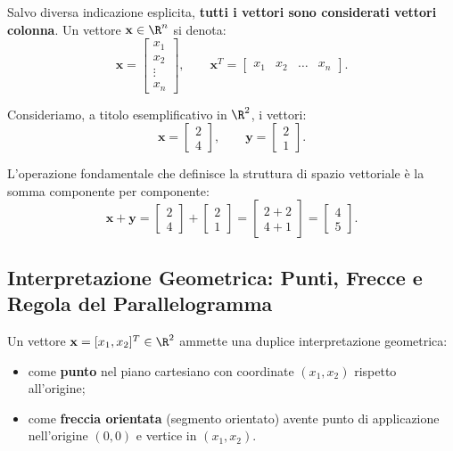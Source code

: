 Salvo diversa indicazione esplicita, \textbf{tutti i vettori sono considerati vettori colonna}. Un vettore $\mathbf{x} \in \R^n$ si denota:
\begin{equation}
    \mathbf{x} = \begin{bmatrix} x_1 \\ x_2 \\ \vdots \\ x_n \end{bmatrix}, \qquad \mathbf{x}^T = \begin{bmatrix} x_1 & x_2 & \dots & x_n \end{bmatrix}.
\end{equation}

Consideriamo, a titolo esemplificativo in $\R^2$, i vettori:
\begin{equation}
    \mathbf{x} = \begin{bmatrix} 2 \\ 4 \end{bmatrix}, \qquad \mathbf{y} = \begin{bmatrix} 2 \\ 1 \end{bmatrix}.
\end{equation}

L'operazione fondamentale che definisce la struttura di spazio vettoriale è la somma componente per componente:
\begin{equation}
    \mathbf{x} + \mathbf{y} = \begin{bmatrix} 2 \\ 4 \end{bmatrix} + \begin{bmatrix} 2 \\ 1 \end{bmatrix} = \begin{bmatrix} 2+2 \\ 4+1 \end{bmatrix} = \begin{bmatrix} 4 \\ 5 \end{bmatrix}.
\end{equation}

\subsection{Interpretazione Geometrica: Punti, Frecce e Regola del Parallelogramma}

Un vettore $\mathbf{x} = [x_1, x_2]^T \in \R^2$ ammette una duplice interpretazione geometrica:
\begin{itemize}
    \item come \textbf{punto} nel piano cartesiano con coordinate $(x_1, x_2)$ rispetto all'origine;
    \item come \textbf{freccia orientata} (segmento orientato) avente punto di applicazione nell'origine $(0,0)$ e vertice in $(x_1, x_2)$.
\end{itemize}

